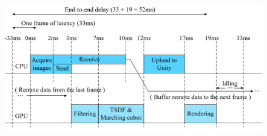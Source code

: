 \begin{figure}[!htbp]
\centering
\includegraphics[width=1.0\linewidth]{figures/figure_pipeline_new3.png}
\caption{}
\label{fig:system_delay}
\end{figure}
